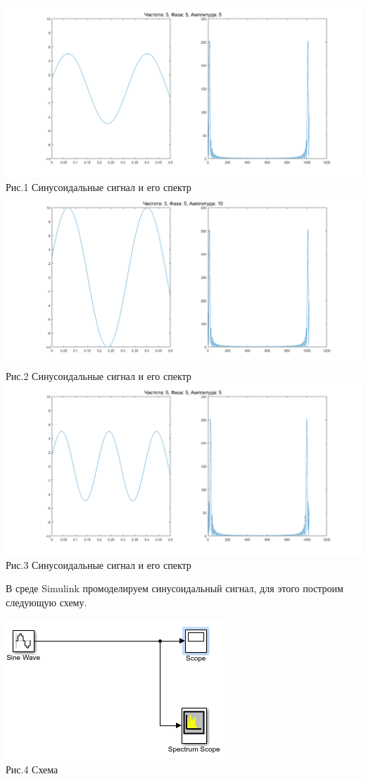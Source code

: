 \documentclass[a4paper]{article}
\begin{document}
\begin{center}
	\includegraphics[scale = 0.5]{pictures/s3_5_5.png}
	\\ Рис.1 Синусоидальные сигнал и его спектр
	\includegraphics[scale = 0.5]{pictures/s3_5_10.png}
	\\ Рис.2 Синусоидальные сигнал и его спектр
	\includegraphics[scale = 0.5]{pictures/s5_5_5.png} 
	\\ Рис.3 Синусоидальные сигнал и его спектр
\end{center} 

В среде Simulink промоделируем синусоидальный сигнал, для этого построим следующую схему.

\begin{center}
	\includegraphics[scale = 0.5]{pictures/sin.png} 
	\\ Рис.4 Схема
\end{center} 
	
\end{document}
